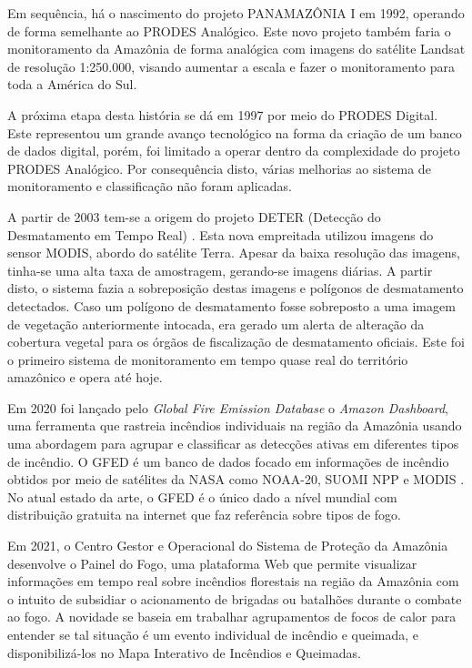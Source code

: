 Em sequência, há o nascimento do projeto PANAMAZÔNIA I \cite{panamazonia} em 1992, operando de forma semelhante ao PRODES Analógico. Este novo projeto também faria o monitoramento da Amazônia de forma analógica com imagens do satélite Landsat de resolução 1:250.000, visando aumentar a escala e fazer o monitoramento para toda a América do Sul. 

A próxima etapa desta história se dá em 1997 por meio do PRODES Digital. Este representou um grande avanço tecnológico na forma da criação de um banco de dados digital, porém, foi limitado a operar dentro da complexidade do projeto PRODES Analógico. Por consequência disto, várias melhorias ao sistema de monitoramento e classificação não foram aplicadas.

A partir de 2003 tem-se a origem do projeto DETER (Detecção do Desmatamento em Tempo Real) \cite{deter}. Esta nova empreitada utilizou imagens do sensor MODIS, abordo do satélite Terra. Apesar da baixa resolução das imagens, tinha-se uma alta taxa de amostragem, gerando-se imagens diárias. A partir disto, o sistema fazia a sobreposição destas imagens e polígonos de desmatamento detectados. Caso um polígono de desmatamento fosse sobreposto a uma imagem de vegetação anteriormente intocada, era gerado um alerta de alteração da cobertura vegetal para os órgãos de fiscalização de desmatamento oficiais. Este foi o primeiro sistema de monitoramento em tempo quase real do território amazônico e opera até hoje.

Em 2020 foi lançado pelo \textit{Global Fire Emission Database} o \textit{Amazon Dashboard}, uma ferramenta que rastreia incêndios individuais na região da Amazônia usando uma abordagem para agrupar e classificar as detecções ativas em diferentes tipos de incêndio. O GFED é um banco de dados focado em informações de incêndio obtidos por meio de satélites da NASA como NOAA-20, SUOMI NPP e MODIS \cite{gfed}. No atual estado da arte, o GFED é o único dado a nível mundial com distribuição gratuita na internet que faz referência sobre tipos de fogo. 


Em 2021, o Centro Gestor e Operacional do Sistema de Proteção da Amazônia desenvolve o Painel do Fogo, uma plataforma Web que permite visualizar informações em tempo real sobre incêndios florestais na região da Amazônia com o intuito de subsidiar o acionamento de brigadas ou batalhões durante o combate ao fogo. A novidade se baseia em trabalhar agrupamentos de focos de calor para entender se tal situação é um evento individual de incêndio e queimada, e disponibilizá-los no Mapa Interativo de Incêndios e Queimadas.


